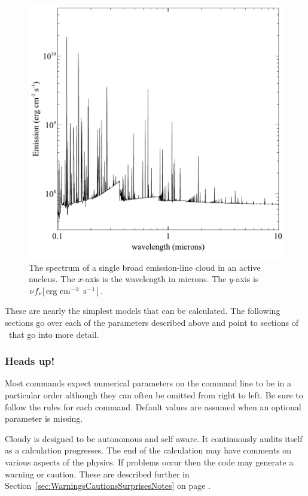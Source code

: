\documentclass[12pt,twoside]{article}
\begin{document}
\begin{figure}
\begin{center}
\includegraphics[clip=on,width=0.8\columnwidth,height=0.8\textheight,keepaspectratio]{BLR_spectrum}
\end{center}
\caption{The spectrum of a single broad emission-line
cloud in an active nucleus.
The $x$-axis is the wavelength in microns.
The $y$-axis is $\nu f_\nu [{\rm\thinspace erg}\, \mbox{${\rm\thinspace cm}^{-2}\,$}\, \mbox{${\rm\thinspace s}^{-1}\,$}]$.}
\label{fig:BLR_spectrum}
\end{figure}

These are nearly the simplest models that can be calculated.  The
following sections go over each of the parameters described above and point
to sections of \Hazy\ that go into more detail.

\subsubsection{Heads up!}

Most commands expect numerical parameters
on the command line to be in
a particular order although they can often be omitted from right to left.
Be sure to follow the rules for each command.  Default values are assumed
when an optional parameter is missing.

Cloudy is designed to be autonomous and self aware.  It continuously
audits itself as a calculation progresses.  The end of the calculation may
have comments on various aspects of the
physics.
If problems occur then
the code may generate a warning or caution.
These are described further in Section~\ref{sec:WarningsCautionsSurprisesNotes}
on page \pageref{sec:WarningsCautionsSurprisesNotes}.
\end{document}
